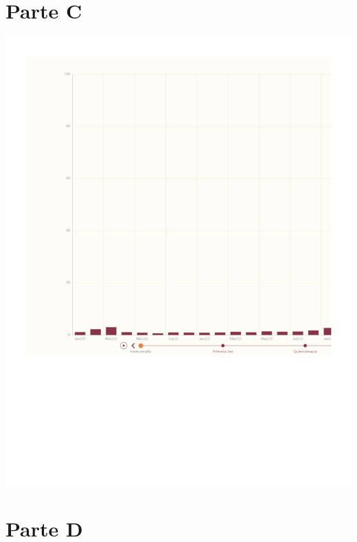 \documentclass[
  letterpaper,
  DIV=11,
  numbers=noendperiod]{scrreprt}
\begin{document}
\section{Parte C}

\includegraphics{intro_files/figure-pdf/unnamed-chunk-8-1.pdf}

\section{Parte D}
\end{document}
